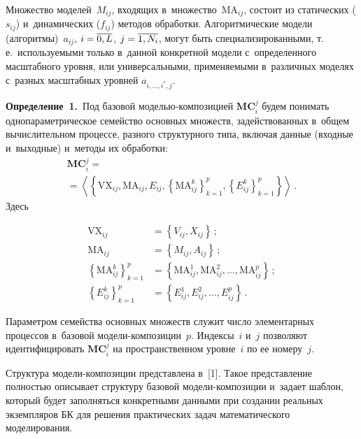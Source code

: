 \begin{multicols}{2}
   Множество моделей~$M_{ij}$, входящих в~множество~$\mathrm{MA}_{ij}$, состоит из 
статических ($s_{ij}$) и~динамических ($f_{ij}$) методов обработки. 
Алгоритмические модели (алгоритмы)~$a_{ij}$, $i\hm=\overline{0,L}$, 
$j\hm=\overline{1,N_i}$, могут быть специализированными, т.\,е.\ используемыми 
только в~данной конкретной модели с~определенного масштабного уровня, или 
универсальными, применяемыми в~различных моделях с~разных масштабных 
уровней $a_{i,\ldots , i^*, j}$.
   
   \smallskip
   
   \noindent
   \textbf{Определение~1.}\ Под базовой мо\-делью-ком\-по\-зи\-ци\-ей 
$\mathbf{MC}_i^j$ будем понимать однопараметрическое семейство основных 
множеств, задействованных в~общем вычислительном процессе, разного 
структурного типа, включая данные (входные и~выходные) и~методы их 
обработки:
   \begin{multline*}
   \mathbf{MC}_i^j={}\\
   {}=\left\langle \left\{ \mathrm{VX}_{ij}, \mathrm{MA}_{ij}, E_{ij}, \left\{ 
\mathrm{MA}^k_{ij}\right\}^p_{k=1},\left\{ E^k_{ij}\right\}^p_{k=1}\right\}\right\rangle\,.
\end{multline*}
   Здесь
   
   \vspace*{-6pt}
   
   \noindent
   \begin{align*}
   \mathrm{VX}_{ij}&=\left\{ V_{ij}, X_{ij}\right\}\,;\\
   \mathrm{MA}_{ij}&=\left\{ M_{ij},  A_{ij}\right\}\,;\\
   \left\{ \mathrm{MA}^k_{ij}\right\}^p_{k=1}&=\left\{ \mathrm{MA}^1_{ij}, \mathrm{MA}^2_{ij},\ldots , 
\mathrm{MA}^p_{ij}\right\}\,;\\
   \left\{ E^k_{ij}\right\}^p_{k=1}&=\left\{ E^1_{ij}, E^2_{ij}, \ldots , 
E^p_{ij}\right\}\,.
   \end{align*}
   
   Параметром семейства основных множеств служит число элементарных 
процессов в~базовой мо\-де\-ли-ком\-по\-зи\-ции~$p$. Индексы~$i$ и~$j$ 
позволяют идентифицировать $\mathbf{MC}_i^j$ на пространственном 
уровне~$i$ по ее номеру~$j$.
   
   Структура модели-ком\-по\-зи\-ции представлена в~[1].
   Такое представление полностью описывает структуру базовой 
   мо\-де\-ли-ком\-по\-зи\-ции и~задает шаблон, который будет заполняться конкретными данными 
при создании реальных экземпляров БК для решения практических задач 
математического моделирования.
   

\end{multicols}
